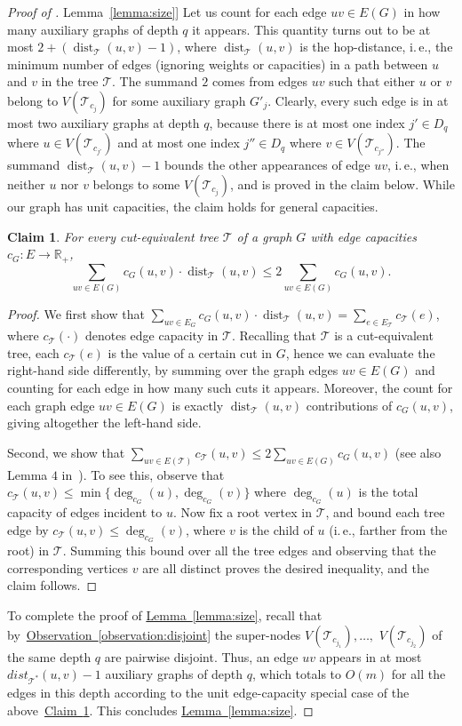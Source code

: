 \documentclass[11pt]{article}
\numberwithin{equation}{section}
\newtheorem{claim}[theorem]{Claim}
\theoremstyle{definition}
\theoremstyle{plain}
\newcommand{\ie}{i.\,e.}
\newcommand{\expref}[2]{\hyperref[#2]{#1~\ref{#2}}}
\theoremstyle{plain}
\DeclareMathOperator{\dist}{dist}
\newcommand{\T}{\mathcal{T}}
\newcommand{\TG}{\mathcal{T}^*}
\begin{document}
\begin{proof}[Proof of \expref{Lemma}{lemma:size}]
Let us count for each edge $uv\in E(G)$ in how many auxiliary graphs
of depth $q$ it appears.
This quantity turns out to be at most $2+(\dist_{\T}(u,v)-1)$,
where $\dist_{\T}(u,v)$ is the hop-distance,
\ie, the minimum number of edges (ignoring weights or capacities)
in a path between $u$ and $v$ in the tree $\T$.
The summand $2$ comes from edges $uv$ such that either $u$ or $v$
belong to $V({\T_{c_j}})$ for some auxiliary graph $G'_j$.
Clearly, every such edge is in at most two auxiliary graphs at depth $q$,
because there is at most one index $j'\in D_q$ where $u\in V({\T_{c_{j'}}})$
and at most one index $j''\in D_q$ where $v\in V({\T_{c_{j''}}})$.
The summand $\dist_{\T}(u,v)-1$ bounds the other appearances of edge $uv$,
\ie, when neither $u$ nor $v$ belongs to some $V({\T_{c_j}})$,
and is proved in the claim below.
While our graph has unit capacities, the claim holds for general capacities.

\begin{claim}\label{claim:technical}
For every cut-equivalent tree $\T$ of a graph $G$ with edge capacities $c_G:E\rightarrow \mathbb{R}_+$,
$$
\sum_{uv\in E(G)} c_G(u,v)\cdot\dist_{\T}(u,v)\leq 2\sum_{uv\in E(G)} c_G(u,v).
$$
\end{claim}

\begin{proof}
  We first show that $\sum_{uv\in E_{G}} c_G(u,v)\cdot\dist_{\T}(u,v) = \sum_{e\in E_{\T}} c_{\T}(e)$,
  where $c_{\T}(\cdot)$ denotes edge capacity in $\T$.
  Recalling that $\T$ is a cut-equivalent tree,
  each $c_{\T}(e)$ is the value of a certain cut in $G$,
  hence we can evaluate the right-hand side differently,
  by summing over the graph edges $uv\in E(G)$
  and counting for each edge in how many such cuts it appears.
  Moreover, the count for each graph edge $uv\in E(G)$
  is exactly $\dist_{\T}(u,v)$ contributions of $c_G(u,v)$,
  giving altogether the left-hand side.

  Second, we show that $\sum_{uv\in E(\T)} c_{\T}(u,v)\leq 2\sum_{uv\in E(G)} c_G(u,v)$ (see also Lemma $4$ in~\cite{BHKP07}).
  To see this, observe that $c_{\T}(u,v)\leq \min\{\deg_{c_G}(u), \deg_{c_G}(v)\}$
  where $\deg_{c_G}(u)$ is the total capacity of edges incident to $u$.
  Now fix a root vertex in $\T$,
  and bound each tree edge by $c_{\T}(u,v)\leq \deg_{c_G}(v)$,
  where $v$ is the child of $u$ (\ie, farther from the root) in $\T$.
  Summing this bound over all the tree edges and observing that the corresponding vertices $v$ are all distinct proves the desired inequality,
  and the claim follows.
\end{proof}

To complete the proof of \expref{Lemma}{lemma:size},
recall that by~\expref{Observation}{observation:disjoint} the super-nodes $V(\T_{c_{j_1}}),\ldots,$ $V(\T_{c_{j_2}})$ of the same depth $q$ are pairwise disjoint. Thus, an edge $uv$ appears in at most $dist_{\TG}(u,v)-1$ auxiliary graphs of depth $q$,
which totals to $O(m)$ for all the edges in this depth according to the unit edge-capacity special case of the above~\expref{Claim}{claim:technical}.
This concludes \expref{Lemma}{lemma:size}.
\end{proof}
\end{document}
